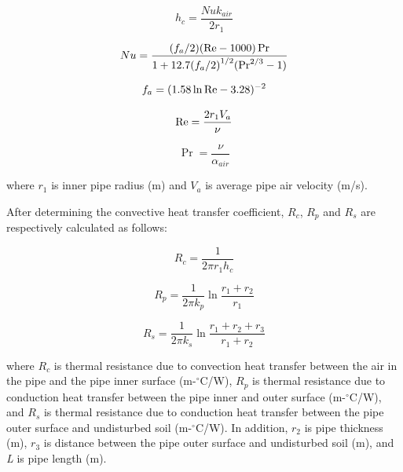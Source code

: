 \begin{equation}
{h_c} = \frac{{Nu{k_{air}}}}{{2{r_1}}}
\end{equation}

\begin{equation}
Nu = \frac{{({f_a}/2)({\mathop{\rm Re}\nolimits}  - 1000)\Pr }}{{1 + 12.7{{({f_a}/2)}^{1/2}}({{\Pr }^{2/3}} - 1)}}
\end{equation}

\begin{equation}
{f_a} = {(1.58\ln {\mathop{\rm Re}\nolimits}  - 3.28)^{ - 2}}
\end{equation}

\begin{equation}
  \mathop{\rm Re}\nolimits  = \frac{{2{r_1}{V_a}}}{\nu }
\end{equation}

\begin{equation}
\Pr  = \frac{\nu }{{{\alpha_{air}}}}
\end{equation}

where \(r_{1}\) is inner pipe radius (m) and \(V_{a}\) is average pipe air velocity (m/s).

After determining the convective heat transfer coefficient, \(R_{c}\), \(R_{p}\) and \(R_{s}\) are respectively calculated as follows:

\begin{equation}
{R_c} = \frac{1}{{2\pi {r_1}{h_c}}}
\end{equation}

\begin{equation}
{R_p} = \frac{1}{{2\pi {k_p}}}\ln \frac{{{r_1} + {r_2}}}{{{r_1}}}
\end{equation}

\begin{equation}
{R_s} = \frac{1}{{2\pi {k_s}}}\ln \frac{{{r_1} + {r_2} + {r_3}}}{{{r_1} + {r_2}}}
\end{equation}

where \(R_{c}\) is thermal resistance due to convection heat transfer between the air in the pipe and the pipe inner surface (m-\(^{\circ}\)C/W), \(R_{p}\) is thermal resistance due to conduction heat transfer between the pipe inner and outer surface (m-\(^{\circ}\)C/W), and \(R_{s}\) is thermal resistance due to conduction heat transfer between the pipe outer surface and undisturbed soil (m-\(^{\circ}\)C/W). In addition, \(r_{2}\) is pipe thickness (m), \(r_{3}\) is distance between the pipe outer surface and undisturbed soil (m), and \emph{L} is pipe length (m).

